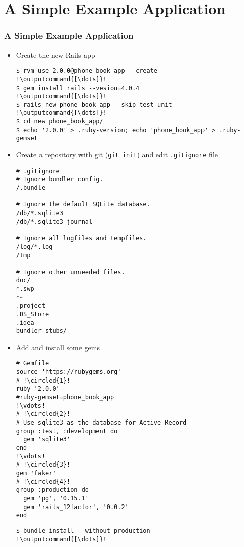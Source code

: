 \documentclass{beamer}
\newcommand*\circled[1]{\tikz[baseline=(char.base)]{
            \node[shape=circle,draw,inner sep=2pt] (char) {#1};}}
\newcommand{\outputcommand}[1]{\color{darkgreen}{#1}}
\begin{document}
\section{A Simple Example Application}
\begin{frame}
\frametitle{A Simple Example Application}
\begin{itemize}
\item Create the new Rails app

\lstset{language=shell}
\begin{lstlisting}[escapechar=!]
$ rvm use 2.0.0@phone_book_app --create
!\outputcommand{[\dots]}!
$ gem install rails --vesion=4.0.4
!\outputcommand{[\dots]}!
$ rails new phone_book_app --skip-test-unit
!\outputcommand{[\dots]}!
$ cd new phone_book_app/
$ echo '2.0.0' > .ruby-version; echo 'phone_book_app' > .ruby-gemset
\end{lstlisting}

\item Create a repository  with git (\texttt{git init}) and edit \texttt{.gitignore} file

\lstset{language=shell}
\begin{lstlisting}
# .gitignore
# Ignore bundler config.
/.bundle     
         
# Ignore the default SQLite database.
/db/*.sqlite3
/db/*.sqlite3-journal
     
# Ignore all logfiles and tempfiles.
/log/*.log
/tmp

# Ignore other unneeded files.
doc/
*.swp
*~
.project
.DS_Store
.idea
bundler_stubs/
\end{lstlisting}

\item Add and install some gems

\lstset{language=Ruby, style=eclipse}
\begin{lstlisting}[escapechar=!]
# Gemfile
source 'https://rubygems.org'
# !\circled{1}!
ruby '2.0.0'
#ruby-gemset=phone_book_app
!\vdots!
# !\circled{2}!
# Use sqlite3 as the database for Active Record
group :test, :development do
  gem 'sqlite3'
end
!\vdots!
# !\circled{3}!
gem 'faker'
# !\circled{4}!
group :production do
  gem 'pg', '0.15.1'
  gem 'rails_12factor', '0.0.2'
end
\end{lstlisting}

\lstset{language=shell}
\begin{lstlisting}[escapechar=!]
$ bundle install --without production
!\outputcommand{[\dots]}!
\end{lstlisting}


\end{itemize}
\end{frame}
\end{document}
